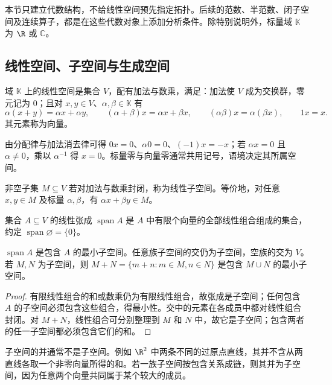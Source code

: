 本节只建立代数结构，不给线性空间预先指定拓扑。后续的范数、半范数、闭子空间及连续算子，都是在这些代数对象上添加分析条件。除特别说明外，标量域 $\mathbb K$ 为 $\R$ 或 $\mathbb C$。

\subsection{线性空间、子空间与生成空间}
\begin{definition}[线性空间]\label{def:y0-vector-space}
域 $\mathbb K$ 上的线性空间是集合 $V$，配有加法与数乘，满足：加法使 $V$ 成为交换群，零元记为 $0$；且对 $x,y\in V$、$\alpha,\beta\in\mathbb K$ 有
\[
 \alpha(x+y)=\alpha x+\alpha y,\qquad
 (\alpha+\beta)x=\alpha x+\beta x,\qquad
 (\alpha\beta)x=\alpha(\beta x),\qquad 1x=x.
\]
其元素称为向量。
\end{definition}

由分配律与加法消去律可得 $0x=0$、$\alpha0=0$、$(-1)x=-x$；若 $\alpha x=0$ 且 $\alpha\ne0$，乘以 $\alpha^{-1}$ 得 $x=0$。标量零与向量零通常共用记号，语境决定其所属空间。

\begin{definition}[子空间与线性张成]\label{def:y0-subspace}
非空子集 $M\subseteq V$ 若对加法与数乘封闭，称为线性子空间。等价地，对任意 $x,y\in M$ 及标量 $\alpha,\beta$，有 $\alpha x+\beta y\in M$。

集合 $A\subseteq V$ 的线性张成 $\operatorname{span}A$ 是 $A$ 中有限个向量的全部线性组合组成的集合，约定 $\operatorname{span}\varnothing=\{0\}$。
\end{definition}

\begin{proposition}[张成与子空间的运算]\label{prop:y0-span}
$\operatorname{span}A$ 是包含 $A$ 的最小子空间。任意族子空间的交仍为子空间，空族的交为 $V$。若 $M,N$ 为子空间，则 $M+N=\{m+n:m\in M,n\in N\}$ 是包含 $M\cup N$ 的最小子空间。
\end{proposition}
\begin{proof}
有限线性组合的和或数乘仍为有限线性组合，故张成是子空间；任何包含 $A$ 的子空间必须包含这些组合，得最小性。交中的元素在各成员中都对线性组合封闭。对 $M+N$，线性组合可分别整理到 $M$ 和 $N$ 中，故它是子空间；包含两者的任一子空间都必须包含它们的和。
\end{proof}

子空间的并通常不是子空间。例如 $\R^2$ 中两条不同的过原点直线，其并不含从两直线各取一个非零向量所得的和。若一族子空间按包含关系成链，则其并为子空间，因为任意两个向量共同属于某个较大的成员。

